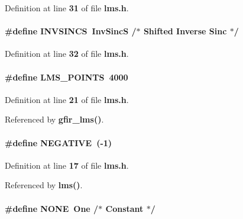 Definition at line {\bf 31} of file {\bf lms.\+h}.

\paragraph[{I\+N\+V\+S\+I\+N\+CS}]{\setlength{\rightskip}{0pt plus 5cm}\#define I\+N\+V\+S\+I\+N\+CS~{\bf Inv\+SincS}	/$\ast$ Shifted Inverse Sinc $\ast$/}\label{lms_8h_af11fd4d6c555d97891e0791c4ddbc606}


Definition at line {\bf 32} of file {\bf lms.\+h}.

\paragraph[{L\+M\+S\+\_\+\+P\+O\+I\+N\+TS}]{\setlength{\rightskip}{0pt plus 5cm}\#define L\+M\+S\+\_\+\+P\+O\+I\+N\+TS~4000}\label{lms_8h_a158b5caeead0c53a38a4fdcffe614e9b}


Definition at line {\bf 21} of file {\bf lms.\+h}.



Referenced by {\bf gfir\+\_\+lms()}.

\paragraph[{N\+E\+G\+A\+T\+I\+VE}]{\setlength{\rightskip}{0pt plus 5cm}\#define N\+E\+G\+A\+T\+I\+VE~(-\/1)}\label{lms_8h_ae8da539b402ed6856028a0a60240bbff}


Definition at line {\bf 17} of file {\bf lms.\+h}.



Referenced by {\bf lms()}.

\paragraph[{N\+O\+NE}]{\setlength{\rightskip}{0pt plus 5cm}\#define N\+O\+NE~{\bf One}		/$\ast$ Constant $\ast$/}\label{lms_8h_a655c84af1b0034986ff56e12e84f983d}


